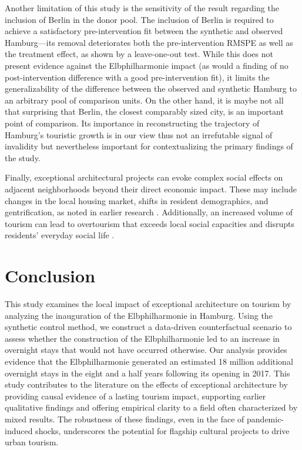 \documentclass[a4paper, 12pt]{article}
\begin{document}
Another limitation of this study is the sensitivity of the result regarding the inclusion of Berlin in the donor pool. The inclusion of Berlin is required to achieve a satisfactory pre-intervention fit between the synthetic and observed Hamburg---its removal deteriorates both the pre-intervention RMSPE as well as the treatment effect, as shown by a leave-one-out test. While this does not present evidence against the Elbphilharmonie impact (as would a finding of no post-intervention difference with a good pre-intervention fit), it limits the generalizability of the difference between the observed and synthetic Hamburg to an arbitrary pool of comparison units. On the other hand, it is maybe not all that surprising that Berlin, the closest comparably sized city, is an important point of comparison. Its importance in reconstructing the trajectory of Hamburg's touristic growth is in our view thus not an irrefutable signal of invalidity but nevertheless important for contextualizing the primary findings of the study.

Finally, exceptional architectural projects can evoke complex social effects on adjacent neighborhoods beyond their direct economic impact. These may include changes in the local housing market, shifts in resident demographics, and gentrification, as noted in earlier research \citep{balke2018, novy2019}. Additionally, an increased volume of tourism can lead to overtourism that exceeds local social capacities and disrupts residents' everyday social life \citep{namberger2019a}.

\section{Conclusion}

This study examines the local impact of exceptional architecture on tourism by analyzing the inauguration of the Elbphilharmonie in Hamburg. Using the synthetic control method, we construct a data-driven counterfactual scenario to assess whether the construction of the Elbphilharmonie led to an increase in overnight stays that would not have occurred otherwise. Our analysis provides evidence that the Elbphilharmonie generated an estimated 18 million additional overnight stays in the eight and a half years following its opening in 2017. This study contributes to the literature on the effects of exceptional architecture by providing causal evidence of a lasting tourism impact, supporting earlier qualitative findings and offering empirical clarity to a field often characterized by mixed results. The robustness of these findings, even in the face of pandemic-induced shocks, underscores the potential for flagship cultural projects to drive urban tourism.
\end{document}
